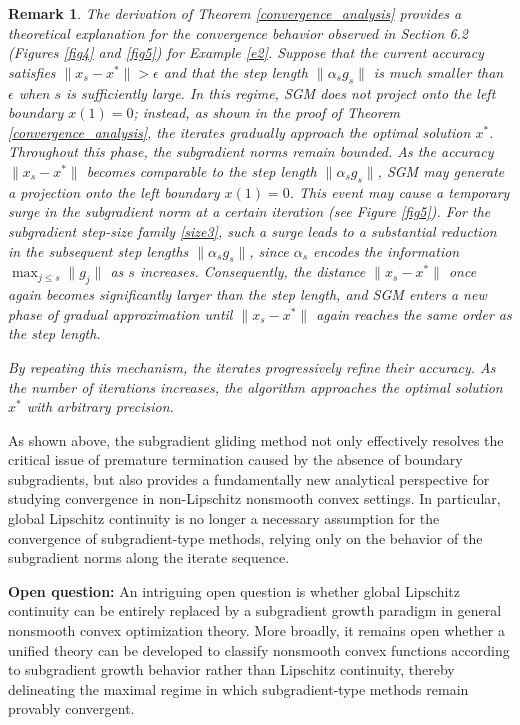 \documentclass[sn-mathphys]{JORSC-jnl}%
\theoremstyle{thmstyleone}%
\newtheorem{remark}{Remark}[section]%
\theoremstyle{thmstylethree}%
\begin{document}
\begin{remark}
	The derivation of Theorem \ref{convergence_analysis} provides a theoretical explanation for the convergence behavior observed in Section 6.2 (Figures \ref{fig4} and \ref{fig5}) for Example \ref{e2}. Suppose that the current accuracy satisfies $\|x_s - x^*\| > \epsilon$ and that the step length $\|\alpha_s g_s\|$ is much smaller than $\epsilon$ when $s$ is sufficiently large. In this regime, SGM does not project onto the left boundary $x(1)=0$; instead, as shown in the proof of Theorem \ref{convergence_analysis}, the iterates gradually approach the optimal solution $x^*$. Throughout this phase, the subgradient norms remain bounded.
	As the accuracy $\|x_s - x^*\|$ becomes comparable to the step length $\|\alpha_s g_s\|$, SGM may generate a projection onto the left boundary $x(1)=0$. This event may cause a temporary surge in the subgradient norm at a certain iteration (see Figure \ref{fig5}). For the subgradient step-size family \eqref{size3}, such a surge leads to a substantial reduction in the subsequent step lengths $\|\alpha_s g_s\|$, since $\alpha_s$ encodes the information $\max_{j \le s} \|g_j\|$ as $s$ increases. Consequently, the distance $\|x_s - x^*\|$ once again becomes significantly larger than the step length, and SGM enters a new phase of gradual approximation until $\|x_s - x^*\|$ again reaches the same order as the step length.
	
	By repeating this mechanism, the iterates progressively refine their accuracy. As the number of iterations increases, the algorithm approaches the optimal solution $x^*$ with arbitrary precision.
\end{remark}

As shown above, the subgradient gliding method not only effectively resolves the critical issue of premature termination caused by the absence of boundary subgradients, but also provides a fundamentally new analytical perspective for studying convergence in non-Lipschitz nonsmooth convex settings. In particular, global Lipschitz continuity is no longer a necessary assumption for the convergence of subgradient-type methods, relying only on the behavior of the subgradient norms along the iterate sequence.

\textbf{Open question:} An intriguing open question is whether global Lipschitz continuity can be entirely replaced by a subgradient growth paradigm in general nonsmooth convex optimization theory. More broadly, it remains open whether a unified theory can be developed to classify nonsmooth convex functions according to subgradient growth behavior rather than Lipschitz continuity, thereby delineating the maximal regime in which subgradient-type methods remain provably convergent.
\end{document}
